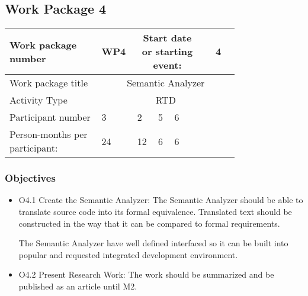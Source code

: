 \subsection{Work Package 4}

\begin{table}[hbpt]\centering
	\begin{tabular}{|p{0.35\linewidth}|p{0.06\linewidth}|p{0.06\linewidth}|p{0.06\linewidth}|
         p{0.06\linewidth}|p{0.06\linewidth}|p{0.06\linewidth}|p{0.06\linewidth}|}\hline
		 Work package number& WP4 &
		 \multicolumn{4}{|c|}{Start date or starting event:}{}&
		 \multicolumn{2}{|c|}{                        4 }{}\\\hline
		 Work package title&\multicolumn{7}{|c|}{Semantic Analyzer}{}\\\hline
		 Activity Type&\multicolumn{7}{|c|}{ RTD }{}\\\hline
		 Participant number & 3 & 2 & 5 & 6 & ~ & ~ & ~ \\\hline
		 Person-months per participant: & 24 & 12 & 6 & 6 & ~ & ~ & ~ \\\hline
	\end{tabular}
\end{table}

\subsubsection{Objectives}
	\begin{itemize}
		\item O4.1 Create the Semantic Analyzer: The Semantic Analyzer should be able to translate source code into its formal equivalence. Translated text should be constructed in the way that it can be compared to formal requirements.
		
		The Semantic Analyzer have well defined interfaced so it can be built into popular and requested integrated development environment.
		\item O4.2 Present Research Work: The work should be summarized and be published as an article until M2.
	\end{itemize}

